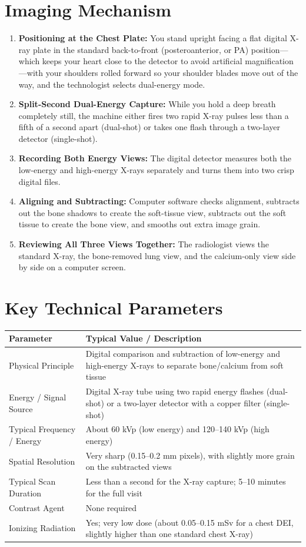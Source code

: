 \section{Imaging Mechanism}
\begin{enumerate}
    \item \textbf{Positioning at the Chest Plate:} You stand upright facing a flat digital X-ray plate in the standard back-to-front (posteroanterior, or PA) position---which keeps your heart close to the detector to avoid artificial magnification---with your shoulders rolled forward so your shoulder blades move out of the way, and the technologist selects dual-energy mode.
    \item \textbf{Split-Second Dual-Energy Capture:} While you hold a deep breath completely still, the machine either fires two rapid X-ray pulses less than a fifth of a second apart (dual-shot) or takes one flash through a two-layer detector (single-shot).
    \item \textbf{Recording Both Energy Views:} The digital detector measures both the low-energy and high-energy X-rays separately and turns them into two crisp digital files.
    \item \textbf{Aligning and Subtracting:} Computer software checks alignment, subtracts out the bone shadows to create the soft-tissue view, subtracts out the soft tissue to create the bone view, and smooths out extra image grain.
    \item \textbf{Reviewing All Three Views Together:} The radiologist views the standard X-ray, the bone-removed lung view, and the calcium-only view side by side on a computer screen.
\end{enumerate}

\section{Key Technical Parameters}
\noindent
\begin{tabularx}{\textwidth}{@{}l X@{}}
\toprule
\textbf{Parameter} & \textbf{Typical Value / Description} \\
\midrule
Physical Principle & Digital comparison and subtraction of low-energy and high-energy X-rays to separate bone/calcium from soft tissue \\
Energy / Signal Source & Digital X-ray tube using two rapid energy flashes (dual-shot) or a two-layer detector with a copper filter (single-shot) \\
Typical Frequency / Energy & About 60 kVp (low energy) and 120--140 kVp (high energy) \\
Spatial Resolution & Very sharp (0.15--0.2 mm pixels), with slightly more grain on the subtracted views \\
Typical Scan Duration & Less than a second for the X-ray capture; 5--10 minutes for the full visit \\
Contrast Agent & None required \\
Ionizing Radiation & Yes; very low dose (about 0.05--0.15 mSv for a chest DEI, slightly higher than one standard chest X-ray) \\
\bottomrule
\end{tabularx}

